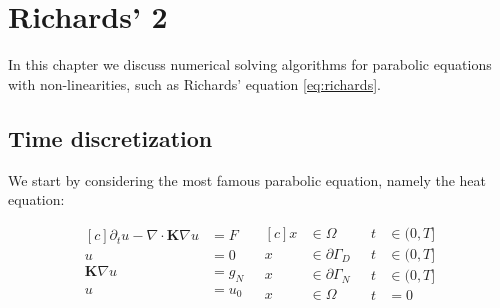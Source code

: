 \documentclass[../Main/main.tex]{subfiles}
\begin{document}
	\graphicspath{{../Time dependent equations/figs/}}
	\chapter{Richards' 2}
	In this chapter we discuss numerical solving algorithms for parabolic equations with non-linearities, such as Richards' equation \eqref{eq:richards}. 
	\section*{Time discretization}
	We start by considering the most famous parabolic equation, namely the heat equation:
	
	\begin{equation}\label{eq:heat equation}
		\begin{aligned}[c]
			\partial_t u - \nabla \cdot \pmb{K} \nabla u &= F \\
			u &= 0 \\
			\pmb{K}\nabla u &= g_N\\
			u &= u_0
		\end{aligned}
		\ \ \
		\begin{aligned}[c]
			x &\in \Omega  \\
			x &\in \partial \Gamma_D \\
			x &\in \partial \Gamma_N \\
			x &\in \Omega  
		\end{aligned}
		\ \ \
		\begin{aligned}
			t&\in (0,T] \\
			t&\in (0,T] \\
			t&\in (0,T] \\
			t&=0
		\end{aligned}
	\end{equation}
	
\end{document}
